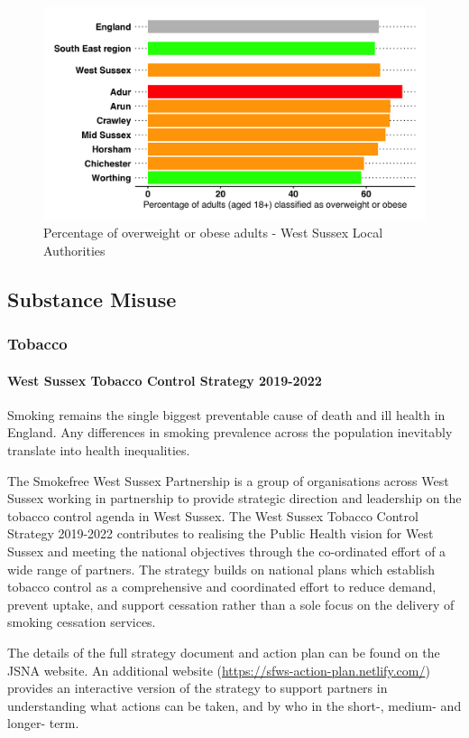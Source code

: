 \begin{figure}[h]
    \caption{Percentage of overweight or obese adults - West Sussex Local Authorities}\label{fig:obesity:rag}
    \centering
    \includegraphics[width=\linewidth]{images/obesity_rag_bar.png}
\end{figure}

\subsection{Substance Misuse}
\subsubsection{Tobacco}
\paragraph{West Sussex Tobacco Control Strategy 2019-2022} Smoking remains the single biggest preventable cause of death and ill health in England. Any differences in smoking prevalence across the population inevitably translate into health inequalities.

The Smokefree West Sussex Partnership is a group of organisations across West Sussex working in partnership to provide strategic direction and leadership on the tobacco control agenda in West Sussex. The West Sussex Tobacco Control Strategy 2019-2022 contributes to realising the Public Health vision for West Sussex and meeting the national objectives through the co-ordinated effort of a wide range of partners. The strategy builds on national plans which establish tobacco control as a comprehensive and coordinated effort to reduce demand, prevent uptake, and support cessation rather than a sole focus on the delivery of smoking cessation services.

The details of the full strategy document and action plan can be found on the JSNA website. An additional website (\url{https://sfws-action-plan.netlify.com/}) provides an interactive version of the strategy to support partners in understanding what actions can be taken, and by who in the short-, medium- and longer- term. 

